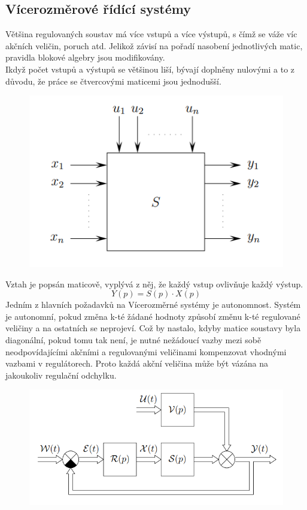 \subsection*{Vícerozměrové řídící systémy}
Většina regulovaných soustav má více vstupů a více výstupů, s čímž se váže víc akčních veličin, poruch atd. Jelikož závisí na pořadí nasobení jednotlivých matic, pravidla blokové algebry jsou modifikovány.\\
Ikdyž počet vstupů a výstupů se většinou liší, bývají doplněny nulovými a to z důvodu, že práce se čtvercovými maticemi jsou jednodušší.
\begin{figure}[H]
    \includegraphics*[scale = 1]{images/vicerozmerneSoustavy.png}
\end{figure}
Vztah je popsán maticově, vyplývá z něj, že každý vstup ovlivňuje každý výstup.
\begin{equation}
    Y(p) = S(p)\cdot X(p)
\end{equation}
Jedním z hlavních požadavků na Vícerozměrné systémy je autonomnost. Systém je autonomní, pokud změna k-té žádané hodnoty způsobí změnu k-té regulované veličiny a na ostatních se neprojeví. Což by nastalo, kdyby matice soustavy byla diagonální, pokud tomu tak není, je nutné nežádoucí vazby mezi sobě neodpovídajícími akčními a regulovanými veličinami kompenzovat vhodnými vazbami v regulátorech. Proto každá akční veličina může být vázána na jakoukoliv regulační odchylku.\\
\begin{figure}[H]
    \includegraphics*[scale = 1]{images/vicerozmerneSoustavySchema.png}
\end{figure}
